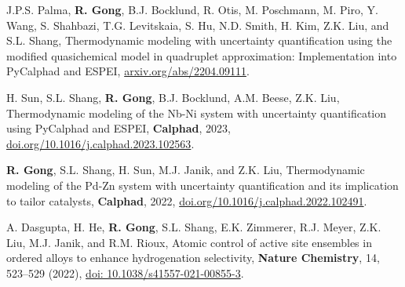 
\begin{etaremune}

\item J.P.S. Palma, \textbf{R. Gong}, B.J. Bocklund, R. Otis, M. Poschmann, M. Piro, Y. Wang, S. Shahbazi, T.G. Levitskaia, S. Hu,  N.D. Smith, H. Kim, Z.K. Liu, and S.L. Shang, 
Thermodynamic modeling with uncertainty quantification using the modified quasichemical model in quadruplet approximation: Implementation into PyCalphad and ESPEI,  
\href{http://arxiv.org/abs/2204.09111}{arxiv.org/abs/2204.09111}.
\item H. Sun, S.L. Shang, \textbf{R. Gong}, B.J. Bocklund, A.M. Beese, Z.K. Liu, 
Thermodynamic modeling of the Nb-Ni system with uncertainty quantification using PyCalphad and ESPEI, 
\textbf{Calphad}, 2023,
\href{https://doi.org/10.1016/j.calphad.2023.102563}{doi.org/10.1016/j.calphad.2023.102563}.
\item \textbf{R. Gong}, S.L. Shang, H. Sun, M.J. Janik, and Z.K. Liu,
Thermodynamic modeling of the Pd-Zn system with uncertainty quantification and its implication to tailor catalysts, 
\textbf{Calphad}, 2022,
\href{https://doi.org/10.1016/j.calphad.2022.102491}{doi.org/10.1016/j.calphad.2022.102491}.
\item  A. Dasgupta, H. He, \textbf{R. Gong}, S.L. Shang, E.K. Zimmerer, R.J. Meyer, Z.K. Liu, M.J. Janik, and R.M. Rioux,
Atomic control of active site ensembles in ordered alloys to enhance hydrogenation selectivity, 
\textbf{Nature Chemistry}, 14, 523–529 (2022),
\href{https://doi.org/10.1038/s41557-021-00855-3}{doi: 10.1038/s41557-021-00855-3}.

\end{etaremune}